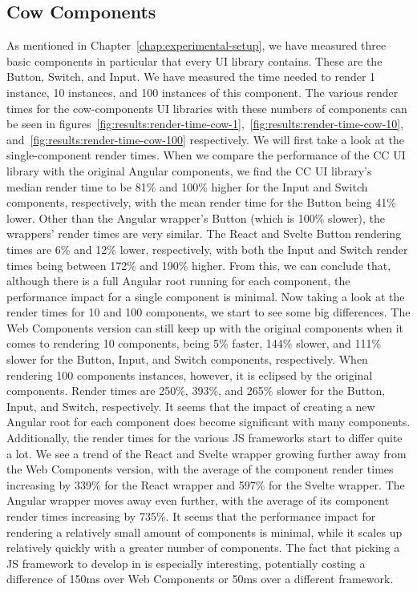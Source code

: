 \subsection{Cow Components}
As mentioned in Chapter~\ref{chap:experimental-setup}, we have measured three basic components in particular that every UI library contains. These are the Button, Switch, and Input. We have measured the time needed to render 1 instance, 10 instances, and 100 instances of this component. The various render times for the cow-components UI libraries with these numbers of components can be seen in figures~\ref{fig:results:render-time-cow-1},~\ref{fig:results:render-time-cow-10}, and~\ref{fig:results:render-time-cow-100} respectively. We will first take a look at the single-component render times. When we compare the performance of the CC UI library with the original Angular components, we find the CC UI library's median render time to be 81\% and 100\% higher for the Input and Switch components, respectively, with the mean render time for the Button being 41\% lower. Other than the Angular wrapper's Button (which is 100\% slower), the wrappers' render times are very similar. The React and Svelte Button rendering times are 6\% and 12\% lower, respectively, with both the Input and Switch render times being between 172\% and 190\% higher. From this, we can conclude that, although there is a full Angular root running for each component, the performance impact for a single component is minimal. Now taking a look at the render times for 10 and 100 components, we start to see some big differences. The Web Components version can still keep up with the original components when it comes to rendering 10 components, being 5\% faster, 144\% slower, and 111\% slower for the Button, Input, and Switch components, respectively. When rendering 100 components instances, however, it is eclipsed by the original components. Render times are 250\%, 393\%, and 265\% slower for the Button, Input, and Switch, respectively. It seems that the impact of creating a new Angular root for each component does become significant with many components.
Additionally, the render times for the various JS frameworks start to differ quite a lot. We see a trend of the React and Svelte wrapper growing further away from the Web Components version, with the average of the component render times increasing by 339\% for the React wrapper and 597\% for the Svelte wrapper. The Angular wrapper moves away even further, with the average of its component render times increasing by 735\%. It seems that the performance impact for rendering a relatively small amount of components is minimal, while it scales up relatively quickly with a greater number of components. The fact that picking a JS framework to develop in is especially interesting, potentially costing a difference of 150ms over Web Components or 50ms over a different framework.

